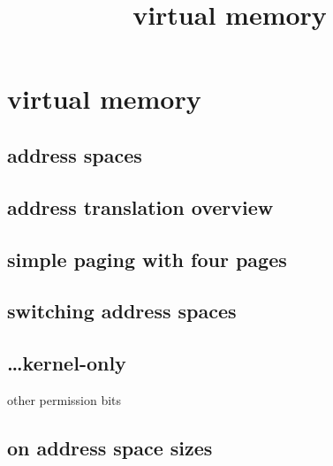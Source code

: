 \graphicspath{{./figures/}}
\title{virtual memory}
\date{}

\begin{frame}
    \titlepage
\end{frame}

\section{virtual memory}

\subsection{address spaces}


\subsection{address translation overview}




\subsection{simple paging with four pages}



\subsection{switching address spaces}



\subsection{\ldots kernel-only}



\begin{frame}{other permission bits}
\end{frame}

\subsection{on address space sizes}

